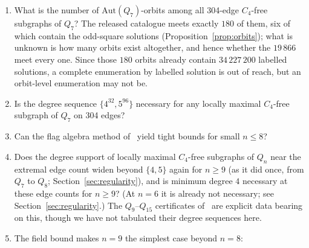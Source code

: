 \documentclass[12pt,a4paper]{article}
\theoremstyle{definition}
\newcommand{\ex}{\mathrm{ex}}
\begin{document}
\begin{enumerate}
    Section~\ref{sec:oddsquareaudit} shows the two questions are genuinely
    different for $n=7$ (the released $304$-edge solutions are
    overwhelmingly non-odd-square), so no assumption is made
    here about which way $n=8$ resolves. Our current understanding of the
    structural side, stated as such: the parity obstruction of
    Proposition~\ref{prop:q6realizability} operates \emph{inside} the
    odd-square class -- it constrains which field histograms a fully
    frustrated spin configuration can realise -- and says nothing about
    non-odd-square subgraphs; we know of no structural obstruction to a
    non-odd-square $C_4$-free subgraph exceeding $g(n)$. What the data show
    is only this: at $n=6$, where $\ex$ is known, nothing exceeds $g(6)$;
    at $n=7$ every known $304$-edge solution matches $g(7)$ while $98\%$
    of them lie outside the subclass. We read the latter as weak evidence
    that the odd-square constraint is not what pins the known extremal
    count, not as evidence about whether $g(8)$ can be exceeded.
  \item\label{op:orbits} What is the number of $\mathrm{Aut}(Q_7)$-orbits among all 304-edge
    $C_4$-free subgraphs of $Q_7$? The released catalogue meets exactly
    $180$ of them, six of which contain the odd-square solutions
    (Proposition~\ref{prop:orbits}); what is unknown is how many orbits exist
    altogether, and hence whether the $19\,866$ meet every one. Since those
    $180$ orbits already contain $34\,227\,200$ labelled solutions, a
    complete enumeration by labelled solution is out of reach, but an
    orbit-level enumeration may not be.
  \item Is the degree sequence $\{4^{32},5^{96}\}$ necessary for any locally
    maximal $C_4$-free subgraph of $Q_7$ on 304 edges?
  \item Can the flag algebra method of~\cite{Bab12,BHLL12} yield tight bounds
    for small $n\le8$?
  \item Does the degree support of locally maximal $C_4$-free subgraphs
    of $Q_n$ near the extremal edge count widen beyond $\{4,5\}$ again
    for $n\ge9$ (as it did once, from $Q_7$ to $Q_8$; Section~\ref{sec:regularity}),
    and is minimum degree $4$ necessary at these edge counts for
    $n\ge9$? (At $n=6$ it is already not necessary; see
    Section~\ref{sec:regularity}.) The $Q_9$--$Q_{15}$ certificates
    of~\cite{EP86} are explicit data bearing on this, though we have not
    tabulated their degree sequences here.
  \item\label{op:n9} The field bound makes $n=9$ the simplest case beyond $n=8$:

\end{enumerate}
\end{document}
